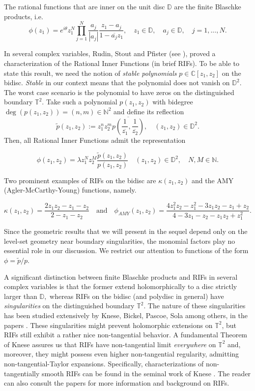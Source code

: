 \documentclass[12pt]{amsart}
\numberwithin{equation}{section}
\begin{document}
The rational functions that are inner on the unit disc $\mathbb{D}$ are the finite Blaschke products, i.e. $$\phi(z_1)=e^{i\theta}z_1^N\prod_{j=1}^N\frac{a_j}{|a_j|}\frac{z_1-a_j}{1-\overline{a_j}z_1}, \quad z_1\in\mathbb{D}, \quad a_j\in \mathbb{D},\quad j=1,...,N.$$

In several complex variables, Rudin, Stout and Pfister (see \cite{Rudin,Pfister}), proved a characterization of the Rational Inner Functions (in brief RIFs). To be able to state this result, we need the notion of \textit{stable polynomials} $p\in\mathbb{C}[z_1,z_2]$ on the bidisc. \textit{Stable} in our context means that the polynomial does not vanish on $\mathbb{D}^2.$ The worst case scenario is the polynomial to have zeros on the distinguished boundary $\mathbb{T}^2.$ Take such a polynomial $p(z_1,z_2)$ with bidegree $\deg(p(z_1,z_2))=(n,m)\in\mathbb{N}^2$ and define its reflection
$$\widetilde{p}(z_1,z_2):=z_1^nz_2^m\overline{p\left(\frac{1}{\overline{z_1}},\frac{1}{\overline{z_2}}\right)},\quad (z_1,z_2)\in\mathbb{D}^2.$$
Then, all Rational Inner Functions admit the representation

$$\phi(z_1,z_2)=\lambda z_1^Nz_2^M\frac{\widetilde{p}(z_1,z_2)}{p(z_1,z_2)}\quad (z_1,z_2)\in\mathbb{D}^2,\quad N,M\in\mathbb{N}.$$

Two prominent examples of RIFs on the bidisc are $\kappa(z_1,z_2)$ and the AMY (Agler-McCarthy-Young) functions, namely.

$$\kappa(z_1,z_2)=\frac{2z_1z_2-z_1-z_2}{2-z_1-z_2} \quad \mathrm{and}\quad \phi_{AMY}(z_1,z_2)=\frac{4z_1^2z_2-z_1^2-3z_1z_2-z_1+z_2}{4-3z_1-z_2-z_1z_2+z_1^2}.$$

Since the geometric results that we will present in the sequel depend only on the level-set geometry near boundary singularities, the monomial factors play no essential role in our discussion. We restrict our attention to functions of the form 
$\phi=\widetilde{p}/p.$ 

A significant distinction between finite Blaschke products and RIFs in several complex variables is that the former extend holomorphically to a disc strictly larger than $\mathbb{D},$ whereas RIFs on the bidisc (and polydisc in general) have \textit{singularities} on the distinguished boundary $\mathbb{T}^2.$ The nature of these singularities has been studied extensively by Knese, Bickel, Pascoe, Sola among others, in the papers \cite{PLMS,Pisa,Clark}. These singularities might prevent holomorphic extensions on $\mathbb{T}^2$, but RIFs still exhibit a rather nice non-tangential behavior. A fundamental Theorem of Knese assures us that RIFs have non-tangential limit \textit{everywhere} on $\mathbb{T}^2$ and, moreover, they might possess even higher non-tangential regularity, admitting non-tangential-Taylor expansions. Specifically, characterizations of non-tangentially smooth RIFs can be found in the seminal work of Knese \cite{Knese2}. The reader can also consult the papers \cite{Polonici,AJM,Hilbert1, Knese1, Knese2, TAMSKNESE, Sola} for more information and background on RIFs.
\end{document}
